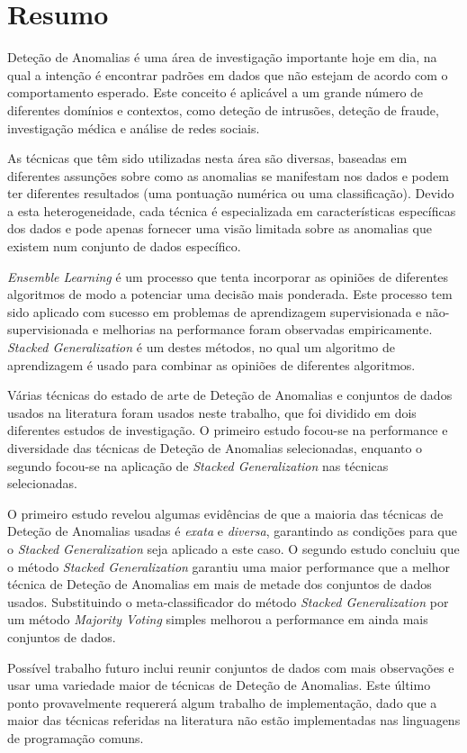 \chapter*{Resumo}

Deteção de Anomalias é uma área de investigação importante hoje em dia, na qual a intenção é encontrar padrões em dados que não estejam de acordo com o comportamento esperado.
Este conceito é aplicável a um grande número de diferentes domínios e contextos, como deteção de intrusões, deteção de fraude, investigação médica e análise de redes sociais.

As técnicas que têm sido utilizadas nesta área são diversas, baseadas em diferentes assunções sobre como as anomalias se manifestam nos dados e podem ter diferentes resultados (uma pontuação numérica ou uma classificação). Devido a esta heterogeneidade, cada técnica é especializada em características específicas dos dados e pode apenas fornecer uma visão limitada sobre as anomalias que existem num conjunto de dados específico.

\textit{Ensemble Learning} é um processo que tenta incorporar as opiniões de diferentes algoritmos de modo a potenciar uma decisão mais ponderada.
Este processo tem sido aplicado com sucesso em problemas de aprendizagem supervisionada e não-supervisionada e melhorias na performance foram observadas empiricamente.
\textit{Stacked Generalization} é um destes métodos, no qual um algoritmo de aprendizagem é usado para combinar as opiniões de diferentes algoritmos.

Várias técnicas do estado de arte de Deteção de Anomalias e conjuntos de dados usados na literatura foram usados neste trabalho, que foi dividido em dois diferentes estudos de investigação.
O primeiro estudo focou-se na performance e diversidade das técnicas de Deteção de Anomalias selecionadas, enquanto o segundo focou-se na aplicação de \textit{Stacked Generalization} nas técnicas selecionadas.

O primeiro estudo revelou algumas evidências de que a maioria das técnicas de Deteção de Anomalias usadas é \textit{exata} e \textit{diversa}, garantindo as condições para que o \textit{Stacked Generalization} seja aplicado a este caso.
O segundo estudo concluiu que o método \textit{Stacked Generalization} garantiu uma maior performance que a melhor técnica de Deteção de Anomalias em mais de metade dos conjuntos de dados usados.
Substituindo o meta-classificador do método \textit{Stacked Generalization} por um método \textit{Majority Voting} simples melhorou a performance em ainda mais conjuntos de dados.

Possível trabalho futuro inclui reunir conjuntos de dados com mais observações e usar uma variedade maior de técnicas de Deteção de Anomalias. Este último ponto provavelmente requererá algum trabalho de implementação, dado que a maior das técnicas referidas na literatura não estão implementadas nas linguagens de programação comuns.
